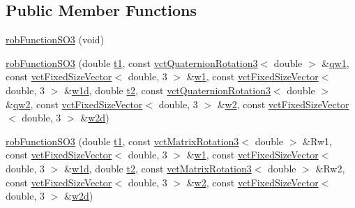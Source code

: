 \subsection*{Public Member Functions}
\begin{DoxyCompactItemize}
\item 
\hyperlink{classrob_function_s_o3_a6d476ee22de0a51149e2866cd51e00bb}{rob\-Function\-S\-O3} (void)
\item 
\hyperlink{classrob_function_s_o3_a2133170b0f0a410790da1200479b3932}{rob\-Function\-S\-O3} (double \hyperlink{classrob_function_a9a4b408a3a5a8ae927caec3b6bac36ef}{t1}, const \hyperlink{classvct_quaternion_rotation3}{vct\-Quaternion\-Rotation3}$<$ double $>$ \&\hyperlink{classrob_function_s_o3_ab39d2e94ec47a7218e8e42209243c628}{qw1}, const \hyperlink{classvct_fixed_size_vector}{vct\-Fixed\-Size\-Vector}$<$ double, 3 $>$ \&\hyperlink{classrob_function_s_o3_a458bc7e9276f38ec681ad5e3a733e73e}{w1}, const \hyperlink{classvct_fixed_size_vector}{vct\-Fixed\-Size\-Vector}$<$ double, 3 $>$ \&\hyperlink{classrob_function_s_o3_ae01c6c68ea9ed10bf462d7103cf3ed7d}{w1d}, double \hyperlink{classrob_function_abf15c2d695ab4cc6336e19862327858f}{t2}, const \hyperlink{classvct_quaternion_rotation3}{vct\-Quaternion\-Rotation3}$<$ double $>$ \&\hyperlink{classrob_function_s_o3_ae8f7673ef36c4dcf8af771af852b974d}{qw2}, const \hyperlink{classvct_fixed_size_vector}{vct\-Fixed\-Size\-Vector}$<$ double, 3 $>$ \&\hyperlink{classrob_function_s_o3_af26136555c376caff1bb1e84f1b3b3f1}{w2}, const \hyperlink{classvct_fixed_size_vector}{vct\-Fixed\-Size\-Vector}$<$ double, 3 $>$ \&\hyperlink{classrob_function_s_o3_a888acaf14bf3ff075b5a13e811e52ab0}{w2d})
\item 
\hyperlink{classrob_function_s_o3_a94f8457a7c91ba2f12d193cd26981982}{rob\-Function\-S\-O3} (double \hyperlink{classrob_function_a9a4b408a3a5a8ae927caec3b6bac36ef}{t1}, const \hyperlink{classvct_matrix_rotation3}{vct\-Matrix\-Rotation3}$<$ double $>$ \&Rw1, const \hyperlink{classvct_fixed_size_vector}{vct\-Fixed\-Size\-Vector}$<$ double, 3 $>$ \&\hyperlink{classrob_function_s_o3_a458bc7e9276f38ec681ad5e3a733e73e}{w1}, const \hyperlink{classvct_fixed_size_vector}{vct\-Fixed\-Size\-Vector}$<$ double, 3 $>$ \&\hyperlink{classrob_function_s_o3_ae01c6c68ea9ed10bf462d7103cf3ed7d}{w1d}, double \hyperlink{classrob_function_abf15c2d695ab4cc6336e19862327858f}{t2}, const \hyperlink{classvct_matrix_rotation3}{vct\-Matrix\-Rotation3}$<$ double $>$ \&Rw2, const \hyperlink{classvct_fixed_size_vector}{vct\-Fixed\-Size\-Vector}$<$ double, 3 $>$ \&\hyperlink{classrob_function_s_o3_af26136555c376caff1bb1e84f1b3b3f1}{w2}, const \hyperlink{classvct_fixed_size_vector}{vct\-Fixed\-Size\-Vector}$<$ double, 3 $>$ \&\hyperlink{classrob_function_s_o3_a888acaf14bf3ff075b5a13e811e52ab0}{w2d})

\end{DoxyCompactItemize}
